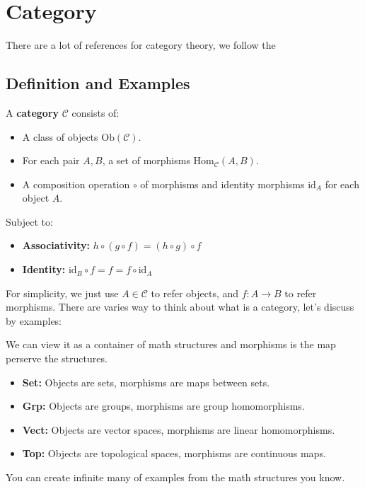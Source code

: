 \chapter{Category}\label{chap:category} 

There are a lot of references for category theory, we follow the \cite{nlab:geometry_of_physics_--_categories_and_toposes}
\section{Definition and Examples}
\begin{definition}[Category]
A \textbf{category} $\mathcal{C}$ consists of:
\begin{itemize}
  \item A class of objects $\mathrm{Ob}(\mathcal{C})$.
    \item For each pair $A, B$, a set of morphisms $\mathrm{Hom}_{\mathcal{C}}(A, B)$.
    \item A composition operation $\circ$ of morphisms and identity morphisms $\mathrm{id}_A$ for each object $A$.
\end{itemize}

Subject to:
\begin{itemize}
    \item \textbf{Associativity:} $h \circ (g \circ f) = (h \circ g) \circ f$
    \item \textbf{Identity:} $\mathrm{id}_B \circ f = f = f \circ \mathrm{id}_A$
\end{itemize}
 
\end{definition}

For simplicity, we just use $A  \in \mathcal{C}$ to refer objects, and $f:A\to B$ to refer morphisms. There are varies way to think about what is a category, let's discuss by examples:

\begin{example}
 We can view it as a container of math structures and morphisms is the map perserve the structures.
 \begin{itemize}
    \item \textbf{Set:} Objects are sets, morphisms are maps between sets.
    \item \textbf{Grp:} Objects are groups, morphisms are group homomorphisms.
    \item \textbf{Vect:} Objects are vector spaces, morphisms are linear homomorphisms.
    \item \textbf{Top:} Objects are topological spaces, morphisms are continuous maps.
\end{itemize}   
You can create infinite many of examples from the math structures you know.
\end{example}


